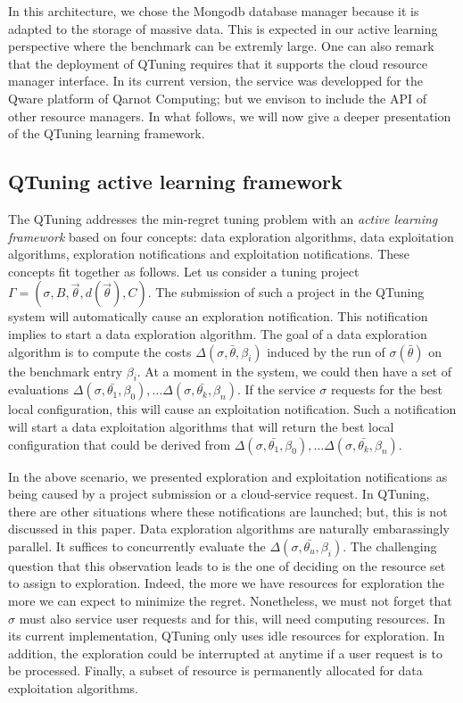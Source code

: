 \documentclass[10pt, conference, compsocconf]{IEEEtran}
\begin{document}
In this architecture, we chose the Mongodb database manager because it is adapted to the storage of massive data. 
This is expected in our active learning perspective where the benchmark can be extremly large.
One can also remark that the deployment of QTuning requires that it supports the cloud resource manager 
interface. In its current version, the service was developped for the Qware 
platform of Qarnot Computing; but we envison to include the API of other resource managers. 
In what follows, we will now give a deeper presentation of the QTuning learning framework.



\subsection{QTuning active learning framework} 

The QTuning addresses the min-regret tuning problem with an {\it active learning framework} 
based on four concepts: data exploration algorithms, data exploitation algorithms, 
exploration notifications and exploitation notifications. These concepts fit together as follows. Let us consider 
a tuning project  $\Gamma = (\sigma, B, \vec{\theta}, d(\vec{\theta}), C)$. The submission of such a project 
in the QTuning system will automatically cause an exploration notification. This notification implies 
to start a data exploration algorithm. The goal of a data exploration algorithm is to  
compute the costs $\Delta(\sigma, \bar{\theta}, \beta_i)$  induced by the run of  $\sigma(\bar{\theta})$ on the benchmark 
entry $\beta_i$.  At a moment in the system, we could then have a set of evaluations 
$\Delta(\sigma, \bar{\theta_1}, \beta_0), \dots \Delta(\sigma, \bar{\theta_k}, \beta_n)$. If the service $\sigma$ 
 requests for the best local configuration, this will cause an exploitation notification. Such a notification will 
start a data exploitation algorithms that will return the best local configuration that could be derived from 
$\Delta(\sigma, \bar{\theta_1}, \beta_0), \dots \Delta(\sigma, \bar{\theta_k}, \beta_n)$.

In the above scenario, we presented exploration and exploitation notifications as being caused by a project submission or a cloud-service 
request. In QTuning, there are other situations where these notifications are launched; but, this is not discussed in this paper.
Data exploration algorithms are naturally embarassingly parallel. It suffices to concurrently evaluate 
the $\Delta(\sigma, \bar{\theta_u}, \beta_i)$. The challenging question that this observation leads to is the 
one of deciding on the resource set to assign to  exploration. Indeed, the more we have resources for exploration 
the more we can expect to minimize the regret. Nonetheless, we must not forget that $\sigma$ must also service 
user requests and for this, will need computing resources. In its current implementation, QTuning only uses 
idle resources for exploration. In addition, the exploration could be interrupted at anytime if a user 
request is to be processed. Finally, a subset of resource is permanently allocated for data exploitation algorithms. 
\end{document}
